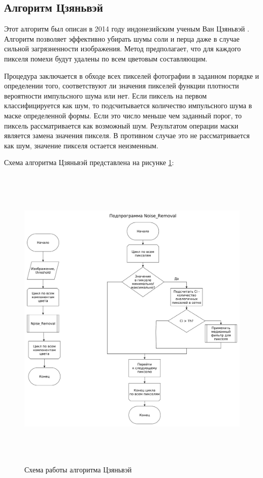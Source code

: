 \subsection{Алгоритм Цзяньвэй}
Этот алгоритм был описан в 2014 году индонезийским ученым Ван Цзяньвэй \cite{color_image}.
Алгоритм позволяет эффективно убирать шумы соли и перца даже в случае сильной загрязненности изображения.
Метод предполагает, что для каждого пикселя помехи будут удалены по всем цветовым составляющим.

Процедура заключается в обходе всех пикселей фотографии в заданном порядке и определении того, соответствуют ли значения пикселей функции плотности вероятности импульсного шума или нет. 
Если пиксель на первом классифицируется как шум, то подсчитывается количество импульсного шума в маске определенной формы. 
Если это число меньше чем заданный порог, то пиксель рассматривается как возможный шум. 
Результатом операции маски является замена значения пикселя.
В противном случае это не рассматривается как шум, значение пикселя остается неизменным.

Схема алгоритма Цзяньвэй представлена на рисунке \ref{fig::china}:
\FloatBarrier
\begin{figure}[h]	
	\begin{center}
		\includegraphics[height=15cm]{inc/pdf/china.pdf}
	\end{center}
	\captionsetup{justification=centering}
	\caption{Схема работы алгоритма Цзяньвэй}
	\label{fig::china}
\end{figure}
\FloatBarrier

